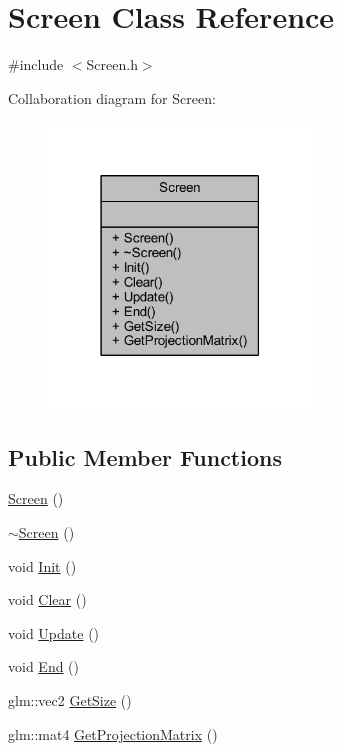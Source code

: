 \hypertarget{class_screen}{}\section{Screen Class Reference}
\label{class_screen}


{\ttfamily \#include $<$Screen.\+h$>$}



Collaboration diagram for Screen\+:
\nopagebreak
\begin{figure}[H]
\begin{center}
\leavevmode
\includegraphics[width=198pt]{class_screen__coll__graph}
\end{center}
\end{figure}
\subsection*{Public Member Functions}
\begin{DoxyCompactItemize}
\item 
\mbox{\hyperlink{class_screen_ae7576476fc6e6a6eaa66389fdc41fe72}{Screen}} ()
\item 
\mbox{\hyperlink{class_screen_a4243bc17596af96415b09ac48205676d}{$\sim$\+Screen}} ()
\item 
void \mbox{\hyperlink{class_screen_a2da4b3a4b37151b4f0ac1e9d3c189d10}{Init}} ()
\item 
void \mbox{\hyperlink{class_screen_aef2c4e4e116cc5d1321392545cba6caa}{Clear}} ()
\item 
void \mbox{\hyperlink{class_screen_a022bd9b551faa54312ef867267865ec7}{Update}} ()
\item 
void \mbox{\hyperlink{class_screen_af1db8b519ceea7831567c8a1e59ff6f7}{End}} ()
\item 
glm\+::vec2 \mbox{\hyperlink{class_screen_a2b2783809f44b124f19b45fbd0c21241}{Get\+Size}} ()
\item 
glm\+::mat4 \mbox{\hyperlink{class_screen_ad43c28bb9ccca3ef351dfd4d9f347fb0}{Get\+Projection\+Matrix}} ()
\end{DoxyCompactItemize}


